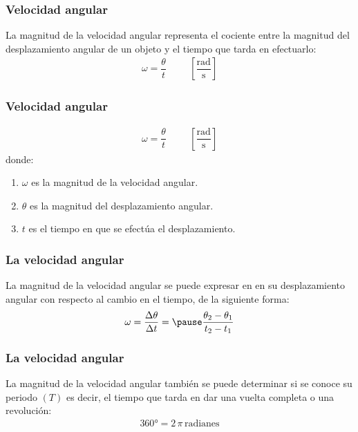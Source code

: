 \documentclass[14pt]{beamer}
\begin{document}
\begin{frame}
\frametitle{Velocidad angular}
La magnitud de la velocidad angular representa el cociente entre la magnitud del desplazamiento angular de un objeto y el tiempo que tarda en efectuarlo:
\pause
\begin{align*}
\omega = \dfrac{\theta}{t} \hspace{1cm} \left[ \dfrac{\text{rad}}{\unit{\second}} \right]
\end{align*}
\end{frame}
\begin{frame}
\frametitle{Velocidad angular}
\vspace*{-1cm}
\begin{align*}
\omega = \dfrac{\theta}{t} \hspace{1cm} \left[ \dfrac{\text{rad}}{\unit{\second}} \right]
\end{align*}    
donde:
\begin{enumerate}[<+->]
\item $\omega$ es la magnitud de la velocidad angular.
\item $\theta$ es la magnitud del desplazamiento angular.
\item $t$ es el tiempo en que se efectúa el desplazamiento.
\end{enumerate}
\end{frame}
\begin{frame}
\frametitle{La velocidad angular}
La magnitud de la velocidad angular se puede expresar en  en su desplazamiento angular con respecto al cambio en el tiempo, de la siguiente forma:
\pause
\begin{eqnarray*}
\begin{aligned}
\omega = \dfrac{\Delta \theta}{\Delta t} = \pause \dfrac{\theta_{2} - \theta_{1}}{t_{2} - t_{1}}
\end{aligned}
\end{eqnarray*}
\end{frame}
\begin{frame}
\frametitle{La velocidad angular}
La magnitud de la velocidad angular también se puede determinar si se conoce su periodo $(T)$ es decir, el tiempo que tarda en dar una vuelta completa o una revolución:
\pause
\begin{align*}
\ang{360}  = 2 \, \pi \, \text{radianes}
\end{align*}
\end{frame}
\end{document}

